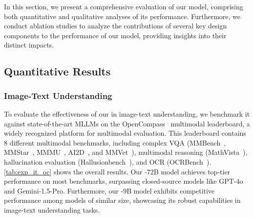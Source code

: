 In this section, we present a comprehensive evaluation of our \method model, comprising both quantitative and qualitative analyses of its performance. Furthermore, we conduct ablation studies to analyze the contributions of several key design components to the performance of our \method model, providing insights into their distinct impacts.


\subsection{Quantitative Results}\label{subsec:exp_quantitative_results}

\subsubsection{Image-Text Understanding}
To evaluate the effectiveness of our \method in image-text understanding, we benchmark it against state-of-the-art MLLMs on the OpenCompass~\cite{2023opencompass} multimodal leaderboard, a widely recognized platform for multimodal evaluation. This leaderboard contains 8 different multimodal benchmarks, including complex VQA (MMBench~\cite{liu2025mmbench}, MMStar~\cite{chen2024we}, MMMU~\cite{yue2023mmmu}, AI2D~\cite{kembhavi2016diagram}, and MMVet~\cite{yu2024mm}), multimodal reasoning (MathVista~\cite{lu2024mathvista}), hallucination evaluation (Hallusionbench~\cite{Guan_2024_hallusionbench}), and OCR (OCRBench~\cite{Liu_2024}).
\cref{tab:exp_it_oc} shows the overall results. Our \method-72B model achieves top-tier performance on most benchmarks, surpassing closed-source models like GPT-4o and Gemini-1.5-Pro. Furthermore, our \method-9B model exhibits competitive performance among models of similar size, showcasing its robust capabilities in image-text understanding tasks.

